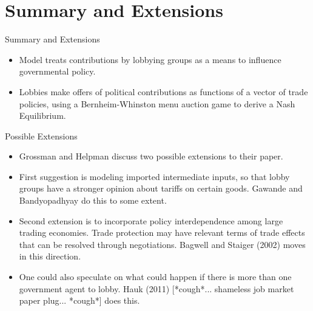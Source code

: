 \documentclass[aspectratio=169]{beamer}
\begin{document}
\section{Summary and Extensions}


\begin{frame}{Summary and Extensions}

\begin{itemize}
    \item<1-> Model treats contributions by lobbying groups as a means to influence governmental policy.
    \item<2-> Lobbies make offers of political contributions as functions of a vector of trade policies, using a Bernheim-Whinston menu auction game to derive a Nash Equilibrium.
\end{itemize}
    
\end{frame}


\begin{frame}{Possible Extensions}

\begin{itemize}
    \item<1-> Grossman and Helpman discuss two possible extensions to their paper.
    \item<2-> First suggestion is modeling imported intermediate inputs, so that lobby groups have a stronger opinion about tariffs on certain goods.  Gawande and Bandyopadhyay do this to some extent.
    \item<3-> Second extension is to incorporate policy interdependence among large trading economies.  Trade protection may have relevant terms of trade effects that can be resolved through negotiations.  Bagwell and Staiger (2002) moves in this direction.
    \item<4-> One could also speculate on what could happen if there is more than one government agent to lobby.  Hauk (2011) [*cough*... shameless job market paper plug... *cough*] does this.
\end{itemize}
    
\end{frame}

\end{document}
